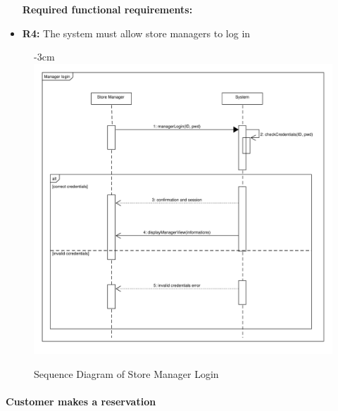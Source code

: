 \documentclass{article}
\begin{document}
\begin{center}
\begin{itemize}
					\bigskip
					\bigskip
					\bigskip
					 {\bfseries Required functional requirements: }
					\item {\bfseries R4: } The system must allow store managers to log in
					

					\end{itemize}

							\begin{figure}
								\begin{adjustwidth} {-3cm}{}
									\centering
									\includegraphics[scale=0.7]{SD/4_managerLogin.pdf}\\
									\caption{Sequence Diagram of Store Manager Login}
								\end{adjustwidth}
							\end{figure}
					
				\end{center}
				\newpage
			
			\paragraph{Customer makes a reservation}
			
\end{document}
